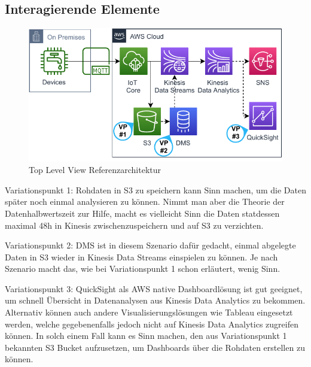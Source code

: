 \subsection{Interagierende Elemente}
\begin{figure}[H]
\centering
\includegraphics[width=\textwidth]{graphics/Echtzeit-RA-Overview.pdf}
\caption{Top Level View Referenzarchitektur}
\label{abb:TopLevelEchtzeitRA}
\end{figure}
Variationspunkt 1: Rohdaten in \ac{S3} zu speichern kann Sinn machen, um die Daten später noch einmal analysieren zu können. Nimmt man aber die Theorie der Datenhalbwertszeit zur Hilfe, macht es vielleicht Sinn die Daten statdessen maximal 48h in Kinesis zwischenzuspeichern und auf \ac{S3} zu verzichten.

Variationspunkt 2: \ac{DMS} ist in diesem Szenario dafür gedacht, einmal abgelegte Daten in S3 wieder in Kinesis Data Streams einspielen zu können. Je nach Szenario macht das, wie bei Variationspunkt 1 schon erläutert, wenig Sinn.

Variationspunkt 3: QuickSight als \ac{AWS} native Dashboardlösung ist gut geeignet, um schnell Übersicht in Datenanalysen aus Kinesis Data Analytics zu bekommen. Alternativ können auch andere Visualisierungslösungen wie Tableau eingesetzt werden, welche gegebenenfalls jedoch nicht auf Kinesis Data Analytics zugreifen können. In solch einem Fall kann es Sinn machen, den aus Variationspunkt 1 bekannten \ac{S3} Bucket aufzusetzen, um Dashboards über die Rohdaten erstellen zu können.

